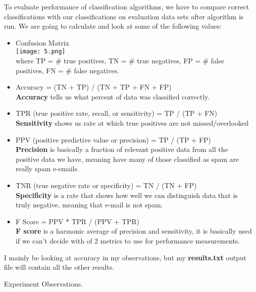 \documentclass[12pt, letterpaper]{article}
\begin{document}
\begin{enumerate}[label=\Roman*.]
	To evaluate performance of  classification algorithms, we have to compare correct classifications with our classifications on evaluation data sets after algorithm is run. We are going to calculate and look at some of the following values: 
	\begin{itemize}
		\item Confusion Matrix \\
		{\center \texttt{[image: 5.png]} \\}
		where TP = \# true positives, TN = \# true negatives, FP = \# false positives, FN = \# false negatives.\\
		\item Accuracy = (TN + TP) / (TN + TP + FN + FP)\\
		{\bf Accuracy} tells us what percent of data was classified correctly. \\
		\item TPR (true positive rate, recall, or sensitivity) = TP / (TP + FN)\\
		{\bf Sensitivity} shows us rate at which true positives are not missed/overlooked \\
		\item PPV (positive predictive value or precision) = TP / (TP + FP)\\
		{\bf Precision} is basically a fraction of relevant positive data from all the positive data we have, meaning have many of those classified as spam are really spam e-emails. \\ 
		\item TNR (true negative rate or specificity) = TN / (TN + FP)\\
		{\bf Specificity} is a rate that shows how well we can distinguish data that is truly negative, meaning that e-mail is not spam.\\
		\item F Score = PPV * TPR / (PPV + TPR)\\
		{\bf F score} is a harmonic average of precision and sensitivity, it is basically used if we can't decide with of 2 metrics to use for performance measurements. \\
	\end{itemize}
	 I mainly be looking at accuracy in my observations, but my {\bf results.txt} output file will contain all the other results.\\
	 
	{\bf \item Experiment Observations. }\\
	

\end{enumerate}
\end{document}
